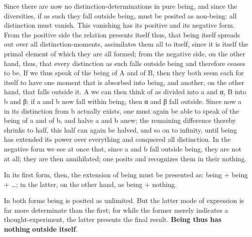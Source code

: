 \documentclass[12pt,a4paper,openany]{book}
\newcommand{\opage}[1]{\marginnote{\footnotesize\textit{[#1]}}}
\begin{document}
Since there are now no distinction-determinations in
pure being, and since the diversities, if as such they
fall outside being, must be posited as non-being:
all distinction must vanish. This vanishing
has its positive and its negative form. From the positive
side the relation presents itself thus, that being itself
spreads out over all distinction-moments, assimilates
them all to itself, since it is itself the primal element
of which they are all formed; from the negative side, on the other hand,
thus, that every distinction as such falls
outside being and therefore ceases to be. If we
thus speak of the being of A and of B, then they both seem
each for itself to have one moment that is absorbed into
\setcounter{footnote}{0}%
\opage{3}being, and another, on the other hand, that falls outside it. A we can
then think of as divided into a and α, B into b and β; if
a and b now fall within being, then α and β fall outside. Since now a in its distinction from b actually exists,
one must again be able to speak of the being of a and of b, and halve a and b anew; the remaining difference
thereby shrinks to half, this half can again
be halved, and so on to infinity, until being
has extended its power over everything and conquered all distinction.
In the negative form we see at once that, since a and b fall
outside being, they are not at all; they are then
annihilated; one posits and recognizes them in their nothing.

In its first form, then, the extension of being must
be presented as: being + being + \dots{}; in the latter, on the other hand, as being + nothing.

In both forms being is posited as unlimited. But the latter mode of expression is far more determinate than
the first; for while the former merely indicates a thought-experiment,
the latter presents the final result. \textbf{Being thus has nothing} \textbf{outside itself}.
\end{document}
